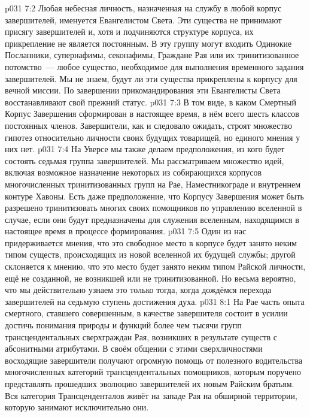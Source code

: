 \vs p031 7:2 Любая небесная личность, назначенная на службу в любой корпус завершителей, именуется Евангелистом Света. Эти существа не принимают присягу завершителей и, хотя и подчиняются структуре корпуса, их прикрепление не является постоянным. В эту группу могут входить Одинокие Посланники, супернафимы, секонафимы, Граждане Рая или их тринитизованное потомство~--- любое существо, необходимое для выполнения временного задания завершителей. Мы не знаем, будут ли эти существа прикреплены к корпусу для вечной миссии. По завершении прикомандирования эти Евангелисты Света восстанавливают свой прежний статус.
\vs p031 7:3 \pc В том виде, в каком Смертный Корпус Завершения сформирован в настоящее время, в нём всего шесть классов постоянных членов. Завершители, как и следовало ожидать, строят множество гипотез относительно личности своих будущих товарищей, но единого мнения у них нет.
\vs p031 7:4 На Уверсе мы также делаем предположения, из кого будет состоять седьмая группа завершителей. Мы рассматриваем множество идей, включая возможное назначение некоторых из собирающихся корпусов многочисленных тринитизованных групп на Рае, Наместникограде и внутреннем контуре Хавоны. Есть даже предположение, что Корпусу Завершения может быть разрешено тринитизовать многих своих помощников по управлению вселенной в случае, если они будут предназначены для служения вселенным, находящимся в настоящее время в процессе формирования.
\vs p031 7:5 Один из нас придерживается мнения, что это свободное место в корпусе будет занято неким типом существ, происходящих из новой вселенной их будущей службы; другой склоняется к мнению, что это место будет занято неким типом Райской личности, ещё не созданной, не возникшей или не тринитизованной. Но весьма вероятно, что мы действительно узнаем это только тогда, когда дождёмся перехода завершителей на седьмую ступень достижения духа.
\vs p031 8:1 На Рае часть опыта смертного, ставшего совершенным, в качестве завершителя состоит в усилии достичь понимания природы и функций более чем тысячи групп трансцендентальных сверхграждан Рая, возникших в результате существ с абсонитными атрибутами. В своём общении с этими сверхличностями восходящие завершители получают огромную помощь от полезного водительства многочисленных категорий трансцендентальных помощников, которым поручено представлять прошедших эволюцию завершителей их новым Райским братьям. Вся категория Трансценденталов живёт на западе Рая на обширной территории, которую занимают исключительно они.
